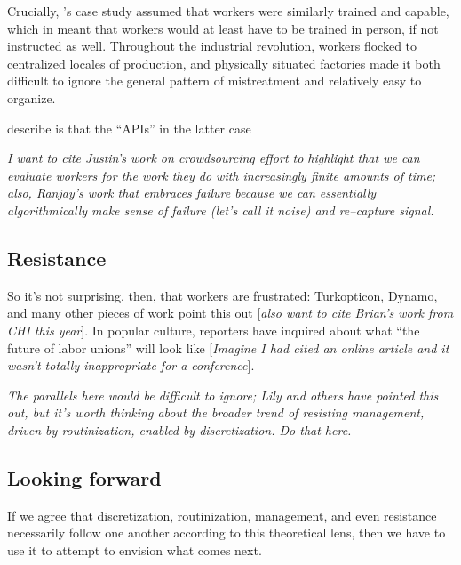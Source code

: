 \documentclass{sigchi}
\begin{document}
Crucially,
\citeauthor{hu1961parallel}'s case study assumed that workers were similarly trained and capable,
which in \citeyear{hu1961parallel}
meant that workers would at least have to be trained in person, if not instructed as well.
Throughout the industrial revolution, workers flocked to centralized locales of production,
and physically situated factories made it both
difficult to ignore the general pattern of mistreatment and
relatively easy to organize.

\citeauthor{storiesIraniSilberman} describe is that the ``APIs'' in the latter case



\textit{I want to cite Justin's work on crowdsourcing effort to highlight that
we can evaluate workers for the work they do with increasingly finite amounts of time;
also, Ranjay's work that embraces failure because
we can essentially algorithmically make sense of failure (let's call it noise)
and re--capture signal.}


\subsection{Resistance}
So it's not surprising, then, that workers are frustrated:
Turkopticon, Dynamo, and many other pieces of work point this out
\cite{turkopticon,dynamo,uberAlgorithm}
[\textit{also want to cite Brian's work from CHI this year}].
In popular culture, reporters have inquired about
what ``the future of labor unions'' will look like
[\textit{Imagine I had cited an online article and
it wasn't totally inappropriate for a conference}].

\textit{The parallels here would be difficult to ignore;
Lily and others have pointed this out,
but it's worth thinking about the broader trend of
resisting management,
driven by routinization,
enabled by discretization.
Do that here.}



\subsection{Looking forward}
If we agree that
discretization,
routinization,
management,
and even resistance
necessarily follow one another according to this theoretical lens,
then we have to use it to attempt to envision
what comes next.
\end{document}
